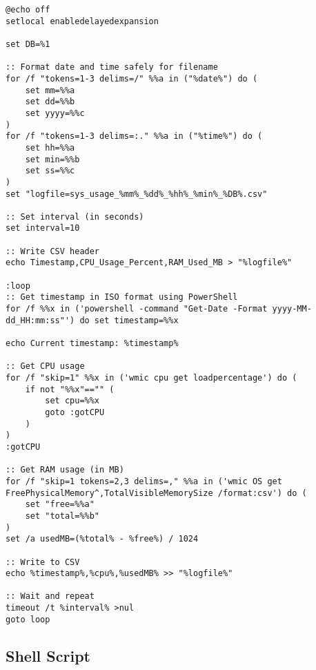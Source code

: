 \begin{lstlisting}[caption={PCStats script to monitor the system in Windows}, label={lst:pcstats-script}]
@echo off
setlocal enabledelayedexpansion

set DB=%1

:: Format date and time safely for filename
for /f "tokens=1-3 delims=/" %%a in ("%date%") do (
    set mm=%%a
    set dd=%%b
    set yyyy=%%c
)
for /f "tokens=1-3 delims=:." %%a in ("%time%") do (
    set hh=%%a
    set min=%%b
    set ss=%%c
)
set "logfile=sys_usage_%mm%_%dd%_%hh%_%min%_%DB%.csv"

:: Set interval (in seconds)
set interval=10

:: Write CSV header
echo Timestamp,CPU_Usage_Percent,RAM_Used_MB > "%logfile%"

:loop
:: Get timestamp in ISO format using PowerShell
for /f %%x in ('powershell -command "Get-Date -Format yyyy-MM-dd_HH:mm:ss"') do set timestamp=%%x

echo Current timestamp: %timestamp%

:: Get CPU usage
for /f "skip=1" %%x in ('wmic cpu get loadpercentage') do (
    if not "%%x"=="" (
        set cpu=%%x
        goto :gotCPU
    )
)
:gotCPU

:: Get RAM usage (in MB)
for /f "skip=1 tokens=2,3 delims=," %%a in ('wmic OS get FreePhysicalMemory^,TotalVisibleMemorySize /format:csv') do (
    set "free=%%a"
    set "total=%%b"
)
set /a usedMB=(%total% - %free%) / 1024

:: Write to CSV
echo %timestamp%,%cpu%,%usedMB% >> "%logfile%"

:: Wait and repeat
timeout /t %interval% >nul
goto loop
\end{lstlisting}

\subsection{Shell Script}
\label{sec:shell-script}

